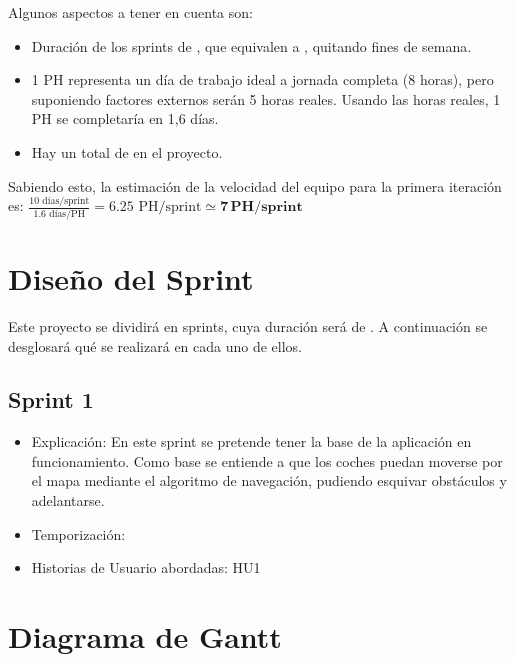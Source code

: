 Algunos aspectos a tener en cuenta son:

\begin{itemize}
    \item Duración de los sprints de \sprintLength, que equivalen a \actualSprintLength, quitando fines de semana.
    \item 1 PH representa un día de trabajo ideal a jornada completa (8 horas), pero suponiendo factores externos serán 5 
    horas reales. Usando las horas reales, 1 PH se completaría en 1,6 días.
    \item Hay un total de \projectph en el proyecto.
\end{itemize}

\bigskip

Sabiendo esto, la estimación de la velocidad del equipo para la primera iteración es: $\frac{10 \text{ días/sprint}}{1.6 \text{ días/PH}} = 6.25 \text{ PH/sprint} \simeq \mathbf{7\,PH/sprint}$

\section{Diseño del Sprint}

Este proyecto se dividirá en \sprintNro sprints, cuya duración será de \sprintLength. A continuación se desglosará qué se realizará en cada uno de ellos.

\subsection{Sprint 1}
\begin{itemize}
    \item Explicación: En este sprint se pretende tener la base de la aplicación en funcionamiento. Como base se entiende a que los coches puedan moverse por el mapa mediante el algoritmo de navegación, pudiendo esquivar obstáculos y adelantarse.
    \item Temporización:
    \item Historias de Usuario abordadas: HU1
\end{itemize}

\section{Diagrama de Gantt}